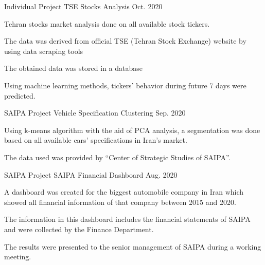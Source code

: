 \begin{cventries}
  \cventry
    {Individual Project} %
    {TSE Stocks Analysis} %
    { } %
    {Oct. 2020} %
    {
      \begin{cvitems} %
        \item {Tehran stocks market analysis done on all available stock tickers.}
        \item {The data was derived from official TSE (Tehran Stock Exchange) website by using data scraping tools}
        \item {The obtained data was stored in a database}
        \item {Using machine learning methods, tickers' behavior during future 7 days were predicted.}
      \end{cvitems}
    }

  \cventry
    {SAIPA Project} %
    {Vehicle Specification Clustering} %
    { } %
    {Sep. 2020} %
    {
      \begin{cvitems} %
        \item {Using k-means algorithm with the aid of PCA analysis, a segmentation was done based on all available cars' specifications in Iran's market.}
        \item {The data used was provided by ``Center of Strategic Studies of SAIPA''.}
      \end{cvitems}
    }

  \cventry
    {SAIPA Project} %
    {SAIPA Financial Dashboard} %
    { } %
    {Aug. 2020} %
    {
      \begin{cvitems} %
        \item {A dashboard was created for the biggest automobile company in Iran which showed all financial information of that company between 2015 and 2020.}
        \item {The information in this dashboard includes the financial statements of SAIPA and were collected by the Finance Department.}
        \item{The results were presented to the senior management of SAIPA during a working meeting.}
      \end{cvitems}
    }

\end{cventries}


